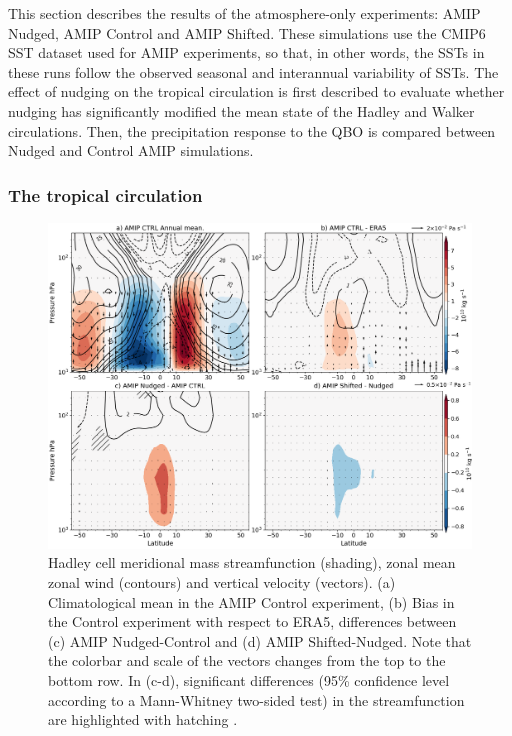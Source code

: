 This section describes the results of the atmosphere-only experiments: AMIP Nudged, AMIP Control and AMIP Shifted. These simulations use the CMIP6 SST dataset used for AMIP experiments, so that, in other words, the SSTs in these runs follow the observed seasonal and interannual variability of SSTs. 
The effect of nudging on the tropical circulation is first described to evaluate whether nudging has significantly modified the mean state of the Hadley and Walker circulations. Then, the precipitation response to the QBO is compared between Nudged and Control AMIP simulations.

\subsubsection{The tropical circulation}

\begin{figure}[t!]
\centering
 \includegraphics[width=\linewidth]{figures/suite_streamhadleyclim.png}
\caption[Hadley cell in atmosphere-only experiments]{Hadley cell meridional mass streamfunction (shading), zonal mean zonal wind (contours) and vertical velocity (vectors). (a) Climatological mean in the AMIP Control experiment, (b) Bias in the Control experiment with respect to ERA5, differences between (c) AMIP Nudged-Control and (d) AMIP Shifted-Nudged. Note that the colorbar and scale of the vectors changes from the top to the bottom row. In (c-d), significant differences (95\% confidence level according to a Mann-Whitney two-sided test) in the streamfunction are highlighted with hatching . }
\label{fig:hadleyamip}
\end{figure}

